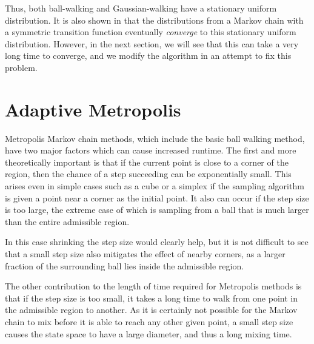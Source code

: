 \documentclass[11pt]{article}
\begin{document}
Thus, both ball-walking and Gaussian-walking have a stationary uniform distribution. It is also shown in \cite{Smith} that the distributions from a Markov chain with a symmetric transition function eventually \emph{converge} to this stationary uniform distribution. However, in the next section, we will see that this can take a very long time to converge, and we modify the algorithm in an attempt to fix this problem.


\section{Adaptive Metropolis}

Metropolis Markov chain methods, which include the basic ball walking method, have two major factors which can cause increased runtime. The first and more theoretically important is that if the current point is close to a corner of the region, then the chance of a step succeeding can be exponentially small. This arises even in simple cases such as a cube or a simplex if the sampling algorithm is given a point near a corner as the initial point. It also can occur if the step size is too large, the extreme case of which is sampling from a ball that is much larger than the entire admissible region. 

In this case shrinking the step size would clearly help, but it is not difficult to see that a small step size also mitigates the effect of nearby corners, as a larger fraction of the surrounding ball lies inside the admissible region.

The other contribution to the length of time required for Metropolis methods is that if the step size is too small, it takes a long time to walk from one point in the admissible region to another. As it is certainly not possible for the Markov chain to mix before it is able to reach any other given point, a small step size causes the state space to have a large diameter, and thus a long mixing time.
\end{document}
